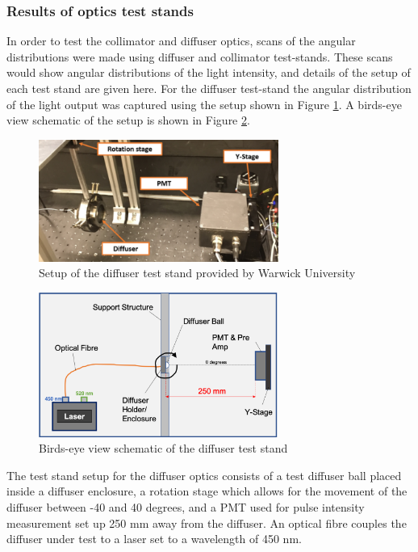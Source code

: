 \subsubsection{Results of optics test stands}

In order to test the collimator and diffuser optics, scans of the angular distributions were made using diffuser and collimator test-stands. These scans would show angular distributions of the light intensity, and details of the setup of each test stand are given here. For the diffuser test-stand the angular distribution of the light output was captured using the setup shown in Figure \ref{fig:diffuser_test_stand}. A birds-eye view schematic of the setup is shown in Figure \ref{fig:schematic_dif}.

\begin{figure}
    \centering
    \includegraphics[width=0.7\textwidth]{Figures/diffuser_test_stand.png}
    \caption{Setup of the diffuser test stand provided by Warwick University}
    \label{fig:diffuser_test_stand}
\end{figure}

\begin{figure}
    \centering
    \includegraphics[width=0.7\textwidth]{Figures/schematic_dif.png}
    \caption{Birds-eye view schematic of the diffuser test stand}
    \label{fig:schematic_dif}
\end{figure}

The test stand setup for the diffuser optics consists of a test diffuser ball placed inside a diffuser enclosure, a rotation stage which allows for the movement of the diffuser between -40 and 40 degrees, and a PMT used for pulse intensity measurement set up 250 mm away from the diffuser. An optical fibre couples the diffuser under test to a laser set to a wavelength of 450 nm. 

